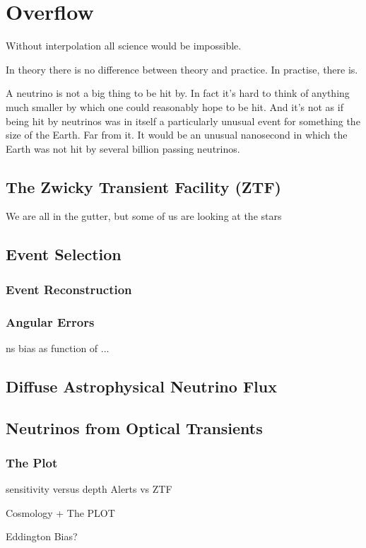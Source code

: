 \setchapterpreamble[u]{\margintoc}
\chapter{Overflow}
\begin{fquote} Without interpolation all science would be impossible. 
\end{fquote}
\begin{fquote} In theory there is no difference between theory and practice. In practise, there is.
\end{fquote}
\begin{fquote} A neutrino is not a big thing to be hit by. In fact it's hard to think of anything much smaller by which one could reasonably hope to be hit. And it's not as if being hit by neutrinos was in itself a particularly unusual event for something the size of the Earth. Far from it. It would be an unusual nanosecond in which the Earth was not hit by several billion passing neutrinos.
\end{fquote}
\section{The Zwicky Transient Facility (ZTF)}
\begin{fquote}We are all in the gutter, but some of us are looking at the stars
\end{fquote}

\section{Event Selection}

\subsection{Event Reconstruction}
\subsection{Angular Errors}

ns bias as function of ...

\section{Diffuse Astrophysical Neutrino Flux}

\section{Neutrinos from Optical Transients}
\subsection{The Plot}
sensitivity versus depth
Alerts vs ZTF

Cosmology + The PLOT

Eddington Bias?